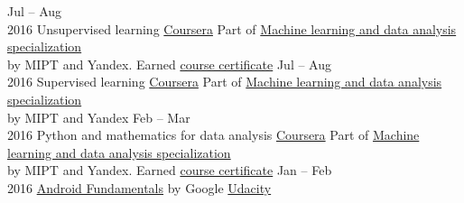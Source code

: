 \documentclass[]{friggeri-cv}
\begin{document}
\begin{entrylist}
	\entry
		{Jul -- Aug \\ 2016}
	 	{Unsupervised learning}
	 	{\href{https://www.coursera.org/}{Coursera}}
	 	{Part of \href{https://www.coursera.org/specializations/machine-learning-data-analysis}{Machine learning and data analysis specialization} \\ by MIPT and Yandex. Earned \href{https://www.coursera.org/account/accomplishments/records/6N7TKQ289MFW}{course certificate}}
	\entry
		{Jul -- Aug \\ 2016}
		{Supervised learning}
		{\href{https://www.coursera.org/}{Coursera}}
		{Part of \href{https://www.coursera.org/specializations/machine-learning-data-analysis}{Machine learning and data analysis specialization} \\ by MIPT and Yandex}
	\entry
		{Feb -- Mar \\ 2016}
	 	{Python and mathematics for data analysis}
	 	{\href{https://www.coursera.org/}{Coursera}}
	 	{Part of \href{https://www.coursera.org/specializations/machine-learning-data-analysis}{Machine learning and data analysis specialization} \\ by MIPT and Yandex. Earned \href{https://www.coursera.org/account/accomplishments/records/7Z3XDDK9GAZ7}{course certificate}}
	\entry
		{Jan -- Feb \\ 2016}
		{\href{https://www.udacity.com/course/new-android-fundamentals--ud851}{Android Fundamentals} by Google}
		{\href{https://www.udacity.com/}{Udacity}}
		{}
\end{entrylist}
\end{document}
